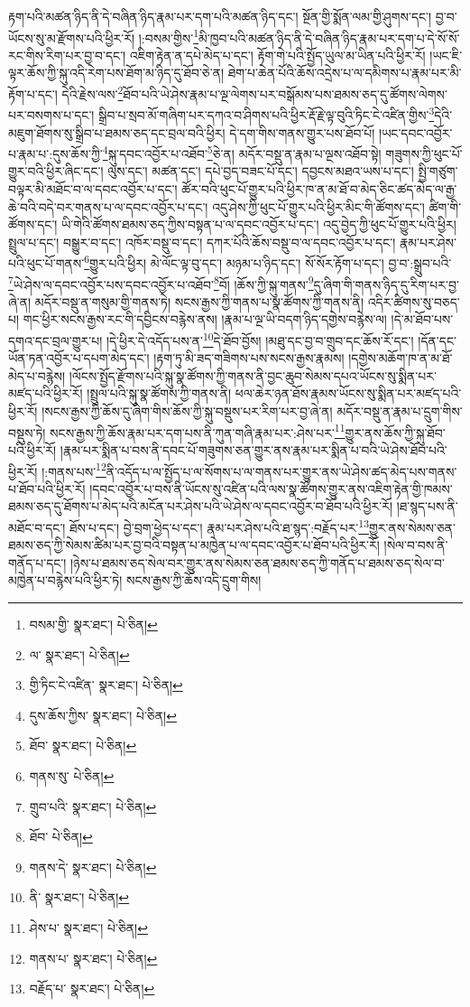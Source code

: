 རྟག་པའི་མཚན་ཉིད་ནི་དེ་བཞིན་ཉིད་རྣམ་པར་དག་པའི་མཚན་ཉིད་དང་། སྔོན་གྱི་སྨོན་ལམ་གྱི་ཤུགས་དང་། བྱ་བ་ཡོངས་སུ་མ་རྫོགས་པའི་ཕྱིར་རོ། །:བསམ་གྱིས་\footnote{བསམ་གྱི་  སྣར་ཐང་།  པེ་ཅིན། }མི་ཁྱབ་པའི་མཚན་ཉིད་ནི་དེ་བཞིན་ཉིད་རྣམ་པར་དག་པ་དེ་སོ་སོ་རང་གིས་རིག་པར་བྱ་བ་དང་། འཇིག་རྟེན་ན་དཔེ་མེད་པ་དང་། རྟོག་གེ་པའི་སྤྱོད་ཡུལ་མ་ཡིན་པའི་ཕྱིར་རོ། །ཡང་ཇི་ལྟར་ཆོས་ཀྱི་སྐུ་འདི་རེག་པས་ཐོག་མ་ཉིད་དུ་ཐོབ་ཅེ་ན། ཐེག་པ་ཆེན་པོའི་ཆོས་འདྲེས་པ་ལ་དམིགས་པ་རྣམ་པར་མི་རྟོག་པ་དང་། དེའི་རྗེས་ལས་\footnote{ལ་  སྣར་ཐང་།  པེ་ཅིན། }ཐོབ་པའི་ཡེ་ཤེས་རྣམ་པ་ལྔ་ལེགས་པར་བསྒོམས་པས་ཐམས་ཅད་དུ་ཚོགས་ལེགས་པར་བསགས་པ་དང་། སྒྲིབ་པ་སྲབ་མོ་གཞིག་པར་དཀའ་བ་ཤིགས་པའི་ཕྱིར་རྡོ་རྗེ་ལྟ་བུའི་ཏིང་ངེ་འཛིན་གྱིས་\footnote{གྱི་ཏིང་ངེ་འཛིན་  སྣར་ཐང་།  པེ་ཅིན། }དེའི་མཇུག་ཐོགས་སུ་སྒྲིབ་པ་ཐམས་ཅད་དང་བྲལ་བའི་ཕྱིར། དེ་དག་གིས་གནས་གྱུར་པས་ཐོབ་པོ། །ཡང་དབང་འབྱོར་པ་རྣམ་པ་:དུས་ཆོས་ཀྱི་\footnote{དུས་ཆོས་ཀྱིས་  སྣར་ཐང་།  པེ་ཅིན། }སྐུ་དབང་འབྱོར་པ་འཐོབ་\footnote{ཐོབ་  སྣར་ཐང་།  པེ་ཅིན། }ཅེ་ན། མདོར་བསྡུ་ན་རྣམ་པ་ལྔས་འཐོབ་སྟེ། གཟུགས་ཀྱི་ཕུང་པོ་གྱུར་བའི་ཕྱིར་ཞིང་དང་། ལུས་དང་། མཚན་དང་། དཔེ་བྱད་བཟང་པོ་དང་། དབྱངས་མཐའ་ཡས་པ་དང་། སྤྱི་གཙུག་བལྟར་མི་མཐོང་བ་ལ་དབང་འབྱོར་པ་དང་། ཚོར་བའི་ཕུང་པོ་གྱུར་པའི་ཕྱིར་ཁ་ན་མ་ཐོ་བ་མེད་ཅིང་ཚད་མེད་ལ་རྒྱ་ཆེ་བའི་བདེ་བར་གནས་པ་ལ་དབང་འབྱོར་པ་དང་། འདུ་ཤེས་ཀྱི་ཕུང་པོ་གྱུར་པའི་ཕྱིར་མིང་གི་ཚོགས་དང་། ཚིག་གི་ཚོགས་དང་། ཡི་གེའི་ཚོགས་ཐམས་ཅད་ཀྱིས་བསྟན་པ་ལ་དབང་འབྱོར་པ་དང་། འདུ་བྱེད་ཀྱི་ཕུང་པོ་གྱུར་པའི་ཕྱིར། སྤྲུལ་པ་དང་། བསྒྱུར་བ་དང་། འཁོར་བསྡུ་བ་དང་། དཀར་པོའི་ཆོས་བསྡུ་བ་ལ་དབང་འབྱོར་པ་དང་། རྣམ་པར་ཤེས་པའི་ཕུང་པོ་གནས་\footnote{གནས་སུ་  པེ་ཅིན། }གྱུར་པའི་ཕྱིར། མེ་ལོང་ལྟ་བུ་དང་། མཉམ་པ་ཉིད་དང་། སོ་སོར་རྟོག་པ་དང་། བྱ་བ་:སྒྲུབ་པའི་\footnote{གྲུབ་པའི་  སྣར་ཐང་།  པེ་ཅིན། }ཡེ་ཤེས་ལ་དབང་འབྱོར་པས་དབང་འབྱོར་པ་འཐོབ་\footnote{ཐོབ་  པེ་ཅིན། }བོ། །ཆོས་ཀྱི་སྐུ་གནས་\footnote{གནས་དེ་  སྣར་ཐང་།  པེ་ཅིན། }དུ་ཞིག་གི་གནས་ཉིད་དུ་རིག་པར་བྱ་ཞེ་ན། མདོར་བསྡུ་ན་གསུམ་གྱི་གནས་ཏེ། སངས་རྒྱས་ཀྱི་གནས་པ་སྣ་ཚོགས་ཀྱི་གནས་ནི། འདིར་ཚིགས་སུ་བཅད་པ། གང་ཕྱིར་སངས་རྒྱས་རང་གི་དབྱིངས་བརྙེས་ནས། །རྣམ་པ་ལྔ་ཡི་བདག་ཉིད་དགྱེས་བརྙེས་ལ། །དེ་མ་ཐོབ་པས་དགའ་དང་བྲལ་གྱུར་པ། །དེ་ཕྱིར་དེ་འདོད་པས་ན་\footnote{ནི་  སྣར་ཐང་།  པེ་ཅིན། }དེ་ཐོབ་བྱོས། །མཐུ་དང་བྱ་བ་གྲུབ་དང་ཆོས་རོ་དང་། །དོན་དང་ཡོན་ཏན་འབྱོར་པ་དཔག་མེད་དང་། །རྟག་ཏུ་མི་ཟད་གཟིགས་པས་སངས་རྒྱས་རྣམས། །དགྱེས་མཆོག་ཁ་ན་མ་ཐོ་མེད་པ་བརྙེས། །ལོངས་སྤྱོད་རྫོགས་པའི་སྐུ་སྣ་ཚོགས་ཀྱི་གནས་ནི་བྱང་ཆུབ་སེམས་དཔའ་ཡོངས་སུ་སྨིན་པར་མཛད་པའི་ཕྱིར་རོ། །སྤྲུལ་པའི་སྐུ་སྣ་ཚོགས་ཀྱི་གནས་ནི། ཕལ་ཆེར་ཉན་ཐོས་རྣམས་ཡོངས་སུ་སྨིན་པར་མཛད་པའི་ཕྱིར་རོ། །སངས་རྒྱས་ཀྱི་ཆོས་དུ་ཞིག་གིས་ཆོས་ཀྱི་སྐུ་བསྡུས་པར་རིག་པར་བྱ་ཞེ་ན། མདོར་བསྡུ་ན་རྣམ་པ་དྲུག་གིས་བསྡུས་ཏེ། སངས་རྒྱས་ཀྱི་ཆོས་རྣམ་པར་དག་པས་ནི་ཀུན་གཞི་རྣམ་པར་:ཤེས་པར་\footnote{ཤེས་པ་  སྣར་ཐང་།  པེ་ཅིན། }གྱུར་ནས་ཆོས་ཀྱི་སྐུ་ཐོབ་པའི་ཕྱིར་རོ། །རྣམ་པར་སྨིན་པ་བས་ནི་དབང་པོ་གཟུགས་ཅན་གྱུར་ནས་རྣམ་པར་སྨིན་པ་བའི་ཡེ་ཤེས་ཐོབ་པའི་ཕྱིར་རོ། །:གནས་པས་\footnote{གནས་པ་  སྣར་ཐང་།  པེ་ཅིན། }ནི་འདོད་པ་ལ་སྤྱོད་པ་ལ་སོགས་པ་ལ་གནས་པར་གྱུར་ནས་ཡེ་ཤེས་ཚད་མེད་པས་གནས་པ་ཐོབ་པའི་ཕྱིར་རོ། །དབང་འབྱོར་པ་བས་ནི་ཡོངས་སུ་འཛིན་པའི་ལས་སྣ་ཚོགས་གྱུར་ནས་འཇིག་རྟེན་གྱི་ཁམས་ཐམས་ཅད་དུ་ཐོགས་པ་མེད་པའི་མངོན་པར་ཤེས་པའི་ཡེ་ཤེས་ལ་དབང་འབྱོར་བ་ཐོབ་པའི་ཕྱིར་རོ། །ཐ་སྙད་པས་ནི་མཐོང་བ་དང་། ཐོས་པ་དང་། བྱེ་བྲག་ཕྱེད་པ་དང་། རྣམ་པར་ཤེས་པའི་ཐ་སྙད་:བརྗོད་པར་\footnote{བརྗོད་པ་  སྣར་ཐང་།  པེ་ཅིན། }གྱུར་ནས་སེམས་ཅན་ཐམས་ཅད་ཀྱི་སེམས་ཚིམ་པར་བྱ་བའི་བསྟན་པ་མཁྱེན་པ་ལ་དབང་འབྱོར་པ་ཐོབ་པའི་ཕྱིར་རོ། །སེལ་བ་བས་ནི་གནོད་པ་དང་། །ཉེས་པ་ཐམས་ཅད་སེལ་བར་གྱུར་ནས་སེམས་ཅན་ཐམས་ཅད་ཀྱི་གནོད་པ་ཐམས་ཅད་སེལ་བ་མཁྱེན་པ་བརྙེས་པའི་ཕྱིར་ཏེ། སངས་རྒྱས་ཀྱི་ཆོས་འདི་དྲུག་གིས། 